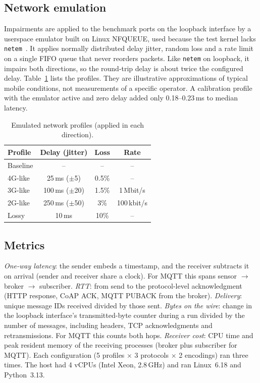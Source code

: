 \documentclass[conference]{IEEEtran}
\begin{document}
\subsection{Network emulation}
Impairments are applied to the benchmark ports on the loopback interface by a userspace emulator built on Linux NFQUEUE, used because the test kernel lacks \texttt{netem}~\cite{hemminger2005}. It applies normally distributed delay jitter, random loss and a rate limit on a single FIFO queue that never reorders packets. Like \texttt{netem} on loopback, it impairs both directions, so the round-trip delay is about twice the configured delay. Table~\ref{tab:profiles} lists the profiles. They are illustrative approximations of typical mobile conditions, not measurements of a specific operator. A calibration profile with the emulator active and zero delay added only 0.18--0.23\,ms to median latency.

\begin{table}[t]
\caption{Emulated network profiles (applied in each direction).}
\label{tab:profiles}
\centering\footnotesize
\begin{tabular}{@{}lccc@{}}
\toprule
Profile & Delay (jitter) & Loss & Rate \\
\midrule
Baseline & -- & -- & -- \\
4G-like & 25\,ms ($\pm$5) & 0.5\% & -- \\
3G-like & 100\,ms ($\pm$20) & 1.5\% & 1\,Mbit/s \\
2G-like & 250\,ms ($\pm$50) & 3\% & 100\,kbit/s \\
Lossy & 10\,ms & 10\% & -- \\
\bottomrule
\end{tabular}
\end{table}

\subsection{Metrics}
\emph{One-way latency}: the sender embeds a timestamp, and the receiver subtracts it on arrival (sender and receiver share a clock). For MQTT this spans sensor $\rightarrow$ broker $\rightarrow$ subscriber. \emph{RTT}: from send to the protocol-level acknowledgment (HTTP response, CoAP ACK, MQTT PUBACK from the broker). \emph{Delivery}: unique message IDs received divided by those sent. \emph{Bytes on the wire}: change in the loopback interface's transmitted-byte counter during a run divided by the number of messages, including headers, TCP acknowledgments and retransmissions. For MQTT this counts both hops. \emph{Receiver cost}: CPU time and peak resident memory of the receiving processes (broker plus subscriber for MQTT). Each configuration (5 profiles $\times$ 3 protocols $\times$ 2 encodings) ran three times. The host had 4 vCPUs (Intel Xeon, 2.8\,GHz) and ran Linux~6.18 and Python~3.13.
\end{document}
